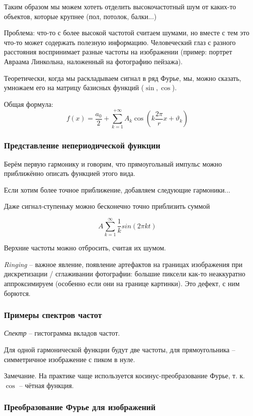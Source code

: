 \documentclass[main.tex]{subfiles}
\begin{document}
Таким образом мы можем хотеть отделить высокочастотный шум от каких-то объектов, которые крупнее (пол, потолок, балки...)

Проблема: что-то с более высокой частотой считаем шумами, но вместе с тем это что-то может содержать полезную информацию.
Человеческий глаз с разного расстояния воспринимает разные частоты на изображении (пример: портрет Авраама Линкольна, наложенный на фотографию пейзажа).

Теоретически, когда мы раскладываем сигнал в ряд Фурье, мы, можно сказать, умножаем его на матрицу базисных функций ($\sin, \cos $).

Общая формула:
$$ f(x) = \frac{a_0}{2} + \sum_{k=1}^{+\infty} A_k \cos\left(k \frac{2\pi}{r}x + \vartheta_k\right)  $$

\subsubsection{Представление непериодической функции}

Берём первую гармонику и говорим, что прямоугольный импульс можно приближённо описать функцией этого вида.

Если хотим более точное приближение, добавляем следующие гармоники...

Даже сигнал-ступеньку можно бесконечно точно приблизить суммой

$$ A\sum_{k=1}^{\infty} \frac{1}{k} sin(2\pi kt) $$

Верхние частоты можно отбросить, считая их шумом.


\emph{Ringing} -- важное явление, появление артефактов на границах изображения при дискретизации / сглаживании фотографии: большие пиксели как-то неаккуратно аппроксимируем (особенно если они на границе картинки).
Это дефект, с ним борются.

\subsubsection{Примеры спектров частот}

\emph{Спектр} -- гистограмма вкладов частот.

Для одной гармонической функции будут две частоты, для прямоугольника -- симметричное изображение с пиком в нуле.

Замечание. На практике чаще используется косинус-преобразование Фурье, т. к. $ \cos $ -- чётная функция.

\subsubsection{Преобразование Фурье для изображений}
\end{document}
